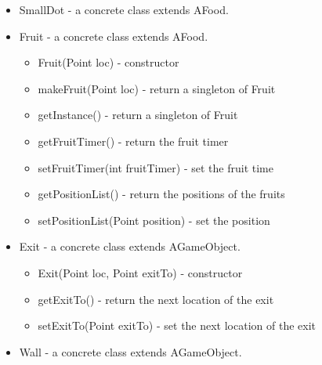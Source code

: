 \documentclass[letterpaper, 11pt]{article}
\begin{document}
\begin{itemize}
  \item SmallDot - a concrete class extends AFood.
  \item Fruit - a concrete class extends AFood.
  \begin{itemize}
  \item Fruit(Point loc) - constructor
  \item makeFruit(Point loc) - return a singleton of Fruit
  \item getInstance() - return a singleton of Fruit
  \item getFruitTimer() - return the fruit timer
  \item setFruitTimer(int fruitTimer) - set the fruit time
  \item getPositionList() - return the positions of the fruits
  \item setPositionList(Point position) - set the position
  \end{itemize}
  \item Exit - a concrete class extends AGameObject.
  \begin{itemize}
  \item Exit(Point loc, Point exitTo) - constructor
  \item getExitTo() - return the next location of the exit
  \item setExitTo(Point exitTo) - set the next location of the exit
  \end{itemize}
  \item Wall - a concrete class extends AGameObject.
\end{itemize}
\end{document}
